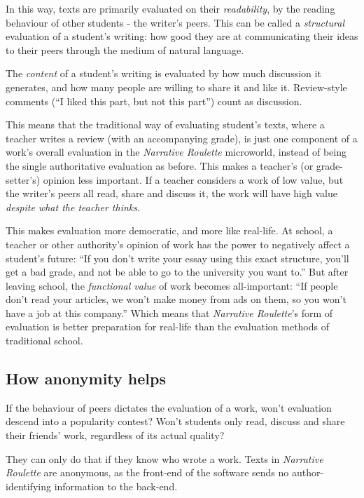 In this way, texts are primarily evaluated on their \emph{readability},
by the reading behaviour of other students - the writer's peers. This
can be called a \emph{structural} evaluation of a student's writing: how
good they are at communicating their ideas to their peers through the medium of
natural language.

The \emph{content} of a student's writing is evaluated by how much
discussion it generates, and how many people are willing to share it and like it.
Review-style comments (``I liked this part, but not this part'') count
as discussion.

This means that the traditional way of evaluating student's texts, where a
teacher writes a review (with an accompanying
grade), is just one component of a work's overall evaluation in the 
\emph{Narrative Roulette} microworld, instead of being the single authoritative evaluation as before. This makes a teacher's (or grade-setter's)
opinion less important. If a teacher considers a work of low value, but
the writer's peers all read, share and discuss it, the work will have high value
\emph{despite what the teacher thinks}.

This makes evaluation more democratic, and more like real-life. At school, a teacher or other authority's opinion of work has the power to
negatively affect a student's future: ``If you don't write your essay
using this exact structure, you'll get a bad grade, and not be able to
go to the university you want to.'' But after leaving school, the \emph{functional value} of work becomes all-important: ``If people don't read
your articles, we won't make money from ads on them, so you won't have a job at this company.'' Which
means that \emph{Narrative Roulette}'s form of evaluation is better
preparation for real-life than the evaluation methods of traditional school.

\subsection{How anonymity helps}

If the behaviour of peers dictates the evaluation of a work, won't
evaluation descend into a popularity contest? Won't students only read,
discuss and share their friends' work, regardless of its actual quality?

They can only do that if they know who wrote a work. Texts in
\emph{Narrative Roulette} are anonymous, as the front-end of the
software sends no author-identifying information to the back-end.

